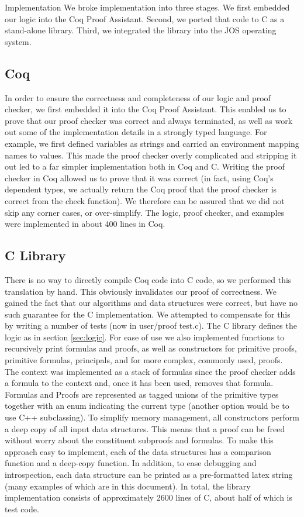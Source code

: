 \documentclass[10pt]{article}
\begin{document}
\begin{section}{Implementation}
We broke implementation into three stages.  We first embedded our logic into the Coq Proof Assistant.  Second, we ported that code to C as a stand-alone library.  Third, we integrated the library into the JOS operating system.
\subsection{Coq}
In order to ensure the correctness and completeness of our logic and proof checker, we first embedded it into the Coq Proof Assistant.  This enabled us to prove that our proof checker was correct and always terminated, as well as work out some of the implementation details in a strongly typed language.  For example, we first defined variables as strings and carried an environment mapping names to values.  This made the proof checker overly complicated and stripping it out led to a far simpler implementation both in Coq and C.  Writing the proof checker in Coq allowed us to prove that it was correct (in fact, using Coq's dependent types, we actually return the Coq proof that the proof checker is correct from the check function).  We therefore can be assured that we did not skip any corner cases, or over-simplify.  The logic, proof checker, and examples were implemented in about 400 lines in Coq.
\subsection{C Library} \label{sec:clib}
There is no way to directly compile Coq code into C code, so we performed this translation by hand.  This obviously invalidates our proof of correctness.  We gained the fact that our algorithms and data structures were correct, but have no such guarantee for the C implementation.  We attempted to compensate for this by writing a number of tests (now in \textsf{user/proof test.c}).  The C library defines the logic as in section \ref{sec:logic}.  For ease of use we also implemented functions to recursively print formulas and proofs, as well as constructors for primitive proofs, primitive formulas, principals, and for more complex, commonly used, proofs.  
\newline\newline
The context was implemented as a stack of formulas since the proof checker adds a formula to the context and, once it has been used, removes that formula.  Formulas and Proofs are represented as tagged \textsf{union}s of the primitive types together with an \textsf{enum} indicating the current type (another option would be to use C++ subclassing).  To simplify memory management, all constructors perform a deep copy of all input data structures.  This means that a proof can be freed without worry about the constituent subproofs and formulas.  To make this approach easy to implement, each of the data structures has a comparison function and a deep-copy function.  In addition, to ease debugging and introspection, each data structure can be printed as a pre-formatted latex string (many examples of which are in this document).  In total, the library implementation consists of approximately 2600 lines of C, about half of which is test code.

\end{section}
\end{document}

